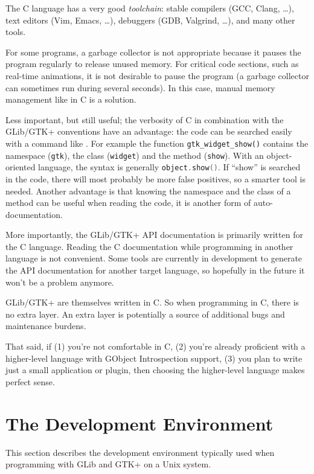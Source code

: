 The C language has a very good \emph{toolchain}: stable compilers (GCC, Clang, …), text editors (Vim, Emacs, …), debuggers (GDB, Valgrind, …), and many other tools.

For some programs, a garbage collector is not appropriate because it pauses the program regularly to release unused memory. For critical code sections, such as real-time animations, it is not desirable to pause the program (a garbage collector can sometimes run during several seconds). In this case, manual memory management like in C is a solution.

Less important, but still useful; the verbosity of C in combination with the GLib/GTK+ conventions have an advantage: the code can be searched easily with a command like . For example the function \lstinline{gtk_widget_show()} contains the namespace (\lstinline{gtk}), the class (\lstinline{widget}) and the method (\lstinline{show}). With an object-oriented language, the syntax is generally \lstinline[language=C++]{object.show()}. If ``show'' is searched in the code, there will most probably be more false positives, so a smarter tool is needed. Another advantage is that knowing the namespace and the class of a method can be useful when reading the code, it is another form of auto-documentation.

More importantly, the GLib/GTK+ API documentation is primarily written for the C language. Reading the C documentation while programming in another language is not convenient. Some tools are currently in development to generate the API documentation for another target language, so hopefully in the future it won't be a problem anymore.

GLib/GTK+ are themselves written in C. So when programming in C, there is no extra layer. An extra layer is potentially a source of additional bugs and maintenance burdens.

That said, if (1) you're not comfortable in C, (2) you're already proficient with a higher-level language with GObject Introspection support, (3) you plan to write just a small application or plugin, then choosing the higher-level language makes perfect sense.

\section{The Development Environment}
\label{intro-dev-environment}

This section describes the development environment typically used when programming with GLib and GTK+ on a Unix system.

